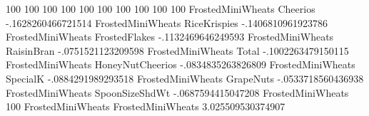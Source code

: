 100%
100%
100%
100%
100%
100%
100%
100%
100%
100%
FrostedMiniWheats	Cheerios	-.1628260466721514
FrostedMiniWheats	RiceKrispies	-.1406810961923786
FrostedMiniWheats	FrostedFlakes	-.1132469646249593
FrostedMiniWheats	RaisinBran	-.0751521123209598
FrostedMiniWheats	Total	-.1002263479150115
FrostedMiniWheats	HoneyNutCheerios	-.0834835263826809
FrostedMiniWheats	SpecialK	-.0884291989293518
FrostedMiniWheats	GrapeNuts	-.0533718560436938
FrostedMiniWheats	SpoonSizeShdWt	-.0687594415047208
FrostedMiniWheats	100%
FrostedMiniWheats	FrostedMiniWheats	3.025509530374907
